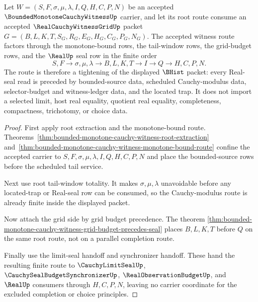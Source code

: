 \begin{theorem}
\label{thm:bounded-monotone-cauchy-witness-route-tightening}
Let $W=(S,F,\sigma,\mu,\lambda,I,Q,H,C,P,N)$ be an accepted $\BoundedMonotoneCauchyWitnessUp$ carrier, and let its root route consume an accepted $\RealCauchyWitnessGridUp$ packet $G=(B,L,K,T,S_G,R_G,E_G,H_G,C_G,P_G,N_G)$. The accepted witness route factors through the monotone-bound rows, the tail-window rows, the grid-budget rows, and the $\RealUp$ seal row in the finite order
$$
S,F \longrightarrow \sigma,\mu,\lambda \longrightarrow B,L,K,T \longrightarrow I \longrightarrow Q \longrightarrow H,C,P,N.
$$
The route is therefore a tightening of the displayed $\BHist$ packet: every Real-seal read is preceded by bounded-source data, scheduled Cauchy-modulus data, selector-budget and witness-ledger data, and the located trap. It does not import a selected limit, host real equality, quotient real equality, completeness, compactness, trichotomy, or choice data.
\end{theorem}
\begin{proof}
First apply root extraction and the monotone-bound route. Theorems~\ref{thm:bounded-monotone-cauchy-witness-root-extraction} and~\ref{thm:bounded-monotone-cauchy-witness-monotone-bound-route} confine the accepted carrier to $S,F,\sigma,\mu,\lambda,I,Q,H,C,P,N$ and place the bounded-source rows before the scheduled tail service.

Next use root tail-window totality. It makes $\sigma,\mu,\lambda$ unavoidable before any located-trap or Real-seal row can be consumed, so the Cauchy-modulus route is already finite inside the displayed packet.

Now attach the grid side by grid budget precedence. The theorem \autoref{thm:bounded-monotone-cauchy-witness-grid-budget-precedes-seal} places $B,L,K,T$ before $Q$ on the same root route, not on a parallel completion route.

Finally use the limit-seal handoff and synchronizer handoff. These hand the resulting finite route to $\CauchyLimitSealUp$, $\CauchySealBudgetSynchronizerUp$, $\RealObservationBudgetUp$, and $\RealUp$ consumers through $H,C,P,N$, leaving no carrier coordinate for the excluded completion or choice principles.
\end{proof}

